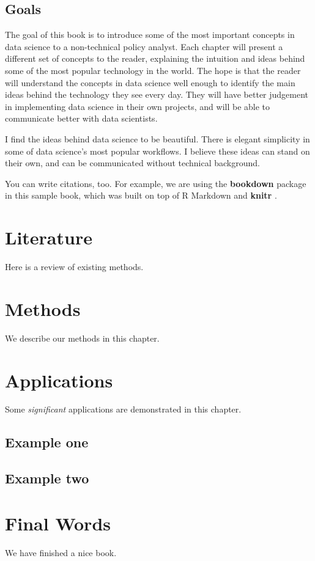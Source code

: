 \documentclass[]{book}
\begin{document}
\hypertarget{goals}{%
\section{Goals}\label{goals}}

The goal of this book is to introduce some of the most important concepts in data science to a non-technical policy analyst. Each chapter will present a different set of concepts to the reader, explaining the intuition and ideas behind some of the most popular technology in the world. The hope is that the reader will understand the concepts in data science well enough to identify the main ideas behind the technology they see every day. They will have better judgement in implementing data science in their own projects, and will be able to communicate better with data scientists.

I find the ideas behind data science to be beautiful. There is elegant simplicity in some of data science's most popular workflows. I believe these ideas can stand on their own, and can be communicated without technical background.

You can write citations, too. For example, we are using the \textbf{bookdown} package \citep{R-bookdown} in this sample book, which was built on top of R Markdown and \textbf{knitr} \citep{xie2015}.

\hypertarget{literature}{%
\chapter{Literature}\label{literature}}

Here is a review of existing methods.

\hypertarget{methods}{%
\chapter{Methods}\label{methods}}

We describe our methods in this chapter.

\hypertarget{applications}{%
\chapter{Applications}\label{applications}}

Some \emph{significant} applications are demonstrated in this chapter.

\hypertarget{example-one}{%
\section{Example one}\label{example-one}}

\hypertarget{example-two}{%
\section{Example two}\label{example-two}}

\hypertarget{final-words}{%
\chapter{Final Words}\label{final-words}}

We have finished a nice book.


\end{document}
